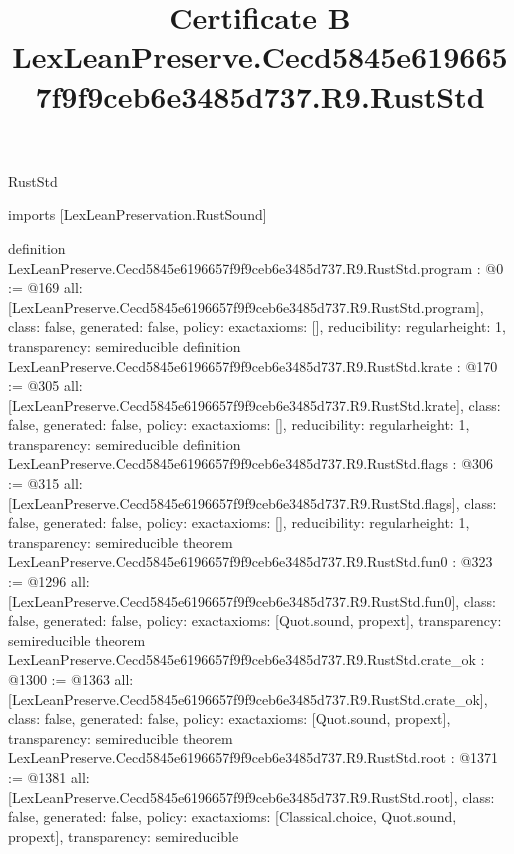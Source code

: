 \begin{lexlean}{RustStd}
\title{Certificate B LexLeanPreserve.Cecd5845e6196657f9f9ceb6e3485d737.R9.RustStd}
\begin{coremodule}
imports [LexLeanPreservation.RustSound]

definition LexLeanPreserve.Cecd5845e6196657f9f9ceb6e3485d737.R9.RustStd.program : @0 := @169 {
  all: [LexLeanPreserve.Cecd5845e6196657f9f9ceb6e3485d737.R9.RustStd.program],
  class: false,
  generated: false,
  policy: exact{axioms: []},
  reducibility: regular{height: 1},
  transparency: semireducible
}
definition LexLeanPreserve.Cecd5845e6196657f9f9ceb6e3485d737.R9.RustStd.krate : @170 := @305 {
  all: [LexLeanPreserve.Cecd5845e6196657f9f9ceb6e3485d737.R9.RustStd.krate],
  class: false,
  generated: false,
  policy: exact{axioms: []},
  reducibility: regular{height: 1},
  transparency: semireducible
}
definition LexLeanPreserve.Cecd5845e6196657f9f9ceb6e3485d737.R9.RustStd.flags : @306 := @315 {
  all: [LexLeanPreserve.Cecd5845e6196657f9f9ceb6e3485d737.R9.RustStd.flags],
  class: false,
  generated: false,
  policy: exact{axioms: []},
  reducibility: regular{height: 1},
  transparency: semireducible
}
theorem LexLeanPreserve.Cecd5845e6196657f9f9ceb6e3485d737.R9.RustStd.fun0 : @323 := @1296 {
  all: [LexLeanPreserve.Cecd5845e6196657f9f9ceb6e3485d737.R9.RustStd.fun0],
  class: false,
  generated: false,
  policy: exact{axioms: [Quot.sound, propext]},
  transparency: semireducible
}
theorem LexLeanPreserve.Cecd5845e6196657f9f9ceb6e3485d737.R9.RustStd.crate_ok : @1300 := @1363 {
  all: [LexLeanPreserve.Cecd5845e6196657f9f9ceb6e3485d737.R9.RustStd.crate_ok],
  class: false,
  generated: false,
  policy: exact{axioms: [Quot.sound, propext]},
  transparency: semireducible
}
theorem LexLeanPreserve.Cecd5845e6196657f9f9ceb6e3485d737.R9.RustStd.root : @1371 := @1381 {
  all: [LexLeanPreserve.Cecd5845e6196657f9f9ceb6e3485d737.R9.RustStd.root],
  class: false,
  generated: false,
  policy: exact{axioms: [Classical.choice, Quot.sound, propext]},
  transparency: semireducible
}


\end{coremodule}
\end{lexlean}
